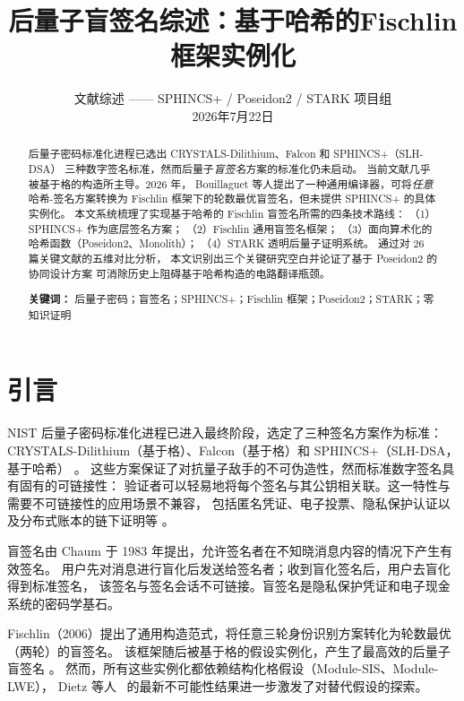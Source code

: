 \documentclass[11pt,a4paper]{ctexart}
\title{\textbf{后量子盲签名综述：基于哈希的Fischlin框架实例化}}
\author{文献综述 —— SPHINCS+ / Poseidon2 / STARK 项目组\\ 2026年7月22日}
\date{}
\begin{document}
\maketitle

\begin{abstract}
后量子密码标准化进程已选出 CRYSTALS-Dilithium、Falcon 和 SPHINCS+（SLH-DSA）
三种数字签名标准，然而后量子\emph{盲签名}方案的标准化仍未启动。
当前文献几乎被基于格的构造所主导。2026 年，
Bouillaguet 等人提出了一种通用编译器，可将\emph{任意}哈希-签名方案转换为
Fischlin 框架下的轮数最优盲签名，但未提供 SPHINCS+ 的具体实例化。
本文系统梳理了实现基于哈希的 Fischlin 盲签名所需的四条技术路线：
（1）SPHINCS+ 作为底层签名方案；
（2）Fischlin 通用盲签名框架；
（3）面向算术化的哈希函数（Poseidon2、Monolith）；
（4）STARK 透明后量子证明系统。
通过对 26 篇关键文献的五维对比分析，
本文识别出三个关键研究空白并论证了基于 Poseidon2 的协同设计方案
可消除历史上阻碍基于哈希构造的电路翻译瓶颈。

\medskip
\noindent\textbf{关键词：}
后量子密码；盲签名；SPHINCS+；Fischlin 框架；Poseidon2；STARK；零知识证明
\end{abstract}

\section{引言}

NIST 后量子密码标准化进程已进入最终阶段，选定了三种签名方案作为标准：
CRYSTALS-Dilithium（基于格）、Falcon（基于格）和 SPHINCS+（SLH-DSA，基于哈希）
\cite{Bernstein2019SPHINCS,NIST2022IR8413}。
这些方案保证了对抗量子敌手的不可伪造性，然而标准数字签名具有固有的可链接性：
验证者可以轻易地将每个签名与其公钥相关联。这一特性与需要不可链接性的应用场景不兼容，
包括匿名凭证、电子投票、隐私保护认证以及分布式账本的链下证明等
\cite{Buser2022ExoticSigs,Chathurangi2025Advances}。

盲签名由 Chaum 于 1983 年提出，允许签名者在不知晓消息内容的情况下产生有效签名。
用户先对消息进行盲化后发送给签名者；收到盲化签名后，用户去盲化得到标准签名，
该签名与签名会话不可链接。盲签名是隐私保护凭证和电子现金系统的密码学基石。

Fischlin（2006）提出了通用构造范式，将任意三轮身份识别方案转化为轮数最优（两轮）的盲签名。
该框架随后被基于格的假设实例化，产生了最高效的后量子盲签名
\cite{delPino2022Framework,Beullens2023LatticeBlind,Agrawal2022Practical,Katsumata2021}。
然而，所有这些实例化都依赖结构化格假设（Module-SIS、Module-LWE），
Dietz 等人~\cite{Dietz2026Impossibility} 的最新不可能性结果进一步激发了对替代假设的探索。
\end{document}

